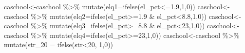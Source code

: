 \documentclass[
  letterpaper,
  DIV=11,
  numbers=noendperiod]{scrartcl}
\newenvironment{Shaded}{\begin{snugshade}}{\end{snugshade}}
\newcommand{\AttributeTok}[1]{\textcolor[rgb]{0.56,0.74,0.73}{#1}}
\newcommand{\DecValTok}[1]{\textcolor[rgb]{0.71,0.56,0.68}{#1}}
\newcommand{\FloatTok}[1]{\textcolor[rgb]{0.71,0.56,0.68}{#1}}
\newcommand{\FunctionTok}[1]{\textcolor[rgb]{0.53,0.75,0.82}{#1}}
\newcommand{\NormalTok}[1]{\textcolor[rgb]{0.85,0.87,0.91}{#1}}
\newcommand{\OtherTok}[1]{\textcolor[rgb]{0.56,0.74,0.73}{#1}}
\newcommand{\SpecialCharTok}[1]{\textcolor[rgb]{0.92,0.80,0.55}{#1}}
\begin{document}
\begin{Shaded}
\begin{Highlighting}[]
\NormalTok{caschool}\OtherTok{\textless{}{-}}\NormalTok{caschool }\SpecialCharTok{\%\textgreater{}\%} \FunctionTok{mutate}\NormalTok{(}\AttributeTok{elq1=}\FunctionTok{ifelse}\NormalTok{(el\_pct}\SpecialCharTok{\textless{}=}\FloatTok{1.9}\NormalTok{,}\DecValTok{1}\NormalTok{,}\DecValTok{0}\NormalTok{))}
\NormalTok{caschool}\OtherTok{\textless{}{-}}\NormalTok{caschool }\SpecialCharTok{\%\textgreater{}\%} \FunctionTok{mutate}\NormalTok{(}\AttributeTok{elq2=}\FunctionTok{ifelse}\NormalTok{(el\_pct}\SpecialCharTok{\textgreater{}=}\FloatTok{1.9} \SpecialCharTok{\&}\NormalTok{ el\_pct}\SpecialCharTok{\textless{}}\FloatTok{8.8}\NormalTok{,}\DecValTok{1}\NormalTok{,}\DecValTok{0}\NormalTok{))}
\NormalTok{caschool}\OtherTok{\textless{}{-}}\NormalTok{caschool }\SpecialCharTok{\%\textgreater{}\%} \FunctionTok{mutate}\NormalTok{(}\AttributeTok{elq3=}\FunctionTok{ifelse}\NormalTok{(el\_pct}\SpecialCharTok{\textgreater{}=}\FloatTok{8.8} \SpecialCharTok{\&}\NormalTok{ el\_pct}\SpecialCharTok{\textless{}}\DecValTok{23}\NormalTok{,}\DecValTok{1}\NormalTok{,}\DecValTok{0}\NormalTok{))}
\NormalTok{caschool}\OtherTok{\textless{}{-}}\NormalTok{caschool }\SpecialCharTok{\%\textgreater{}\%} \FunctionTok{mutate}\NormalTok{(}\AttributeTok{elq4=}\FunctionTok{ifelse}\NormalTok{(el\_pct}\SpecialCharTok{\textgreater{}=}\DecValTok{23}\NormalTok{,}\DecValTok{1}\NormalTok{,}\DecValTok{0}\NormalTok{))}
\NormalTok{caschool}\OtherTok{\textless{}{-}}\NormalTok{caschool }\SpecialCharTok{\%\textgreater{}\%}   \FunctionTok{mutate}\NormalTok{(}\AttributeTok{str\_20 =} \FunctionTok{ifelse}\NormalTok{(str}\SpecialCharTok{\textless{}}\DecValTok{20}\NormalTok{, }\DecValTok{1}\NormalTok{,}\DecValTok{0}\NormalTok{))}
\end{Highlighting}
\end{Shaded}
\end{document}
